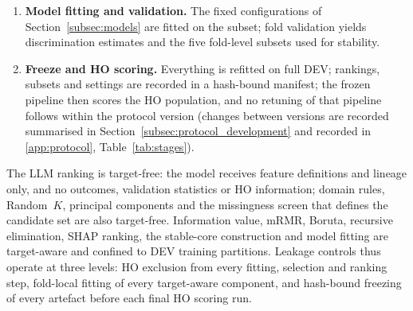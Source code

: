 \documentclass[final,5p,twocolumn]{elsarticle}
\newcommand{\Kfeat}{K}
\providecommand{\DIFaddtex}[1]{{\protect\color{blue} \sf #1}} %
\providecommand{\DIFdeltex}[1]{{\protect\color{red} \scriptsize #1}} %
\providecommand{\DIFaddbegin}{} %
\providecommand{\DIFaddend}{} %
\providecommand{\DIFdelbegin}{} %
\providecommand{\DIFdelend}{} %
\providecommand{\DIFadd}[1]{\texorpdfstring{\DIFaddtex{#1}}{#1}} %
\providecommand{\DIFdel}[1]{\texorpdfstring{\DIFdeltex{#1}}{}} %
\begin{document}
\begin{enumerate}
    \item \textbf{Model fitting and validation.} The fixed configurations of Section~\ref{subsec:models} are fitted on the subset; fold validation yields discrimination estimates and the five fold-level subsets used for stability.
  \item \textbf{Freeze and HO scoring.} Everything is refitted on full DEV; rankings, subsets and settings are recorded in a hash-bound manifest; the frozen pipeline then scores the HO population, and no retuning of that pipeline follows within the protocol version (changes between versions are \DIFdelbegin \DIFdel{recorded }\DIFdelend \DIFaddbegin \DIFadd{summarised }\DIFaddend in Section~\ref{subsec:protocol_development} and \DIFaddbegin \DIFadd{recorded in \ref{app:protocol}, }\DIFaddend Table~\ref{tab:stages}).
\end{enumerate}
The LLM ranking is target-free: the model receives feature definitions and lineage only, and no outcomes, validation statistics or HO information; domain rules, Random~$\Kfeat$, principal components and the missingness screen that defines the candidate set are also target-free. Information value, mRMR, Boruta, recursive elimination, SHAP ranking, the stable-core construction and model fitting are target-aware and confined to DEV training partitions. Leakage controls thus operate at three levels: HO exclusion from every fitting, selection and ranking step, fold-local fitting of every target-aware component, and hash-bound freezing of every artefact before each final HO scoring run.
\end{document}
